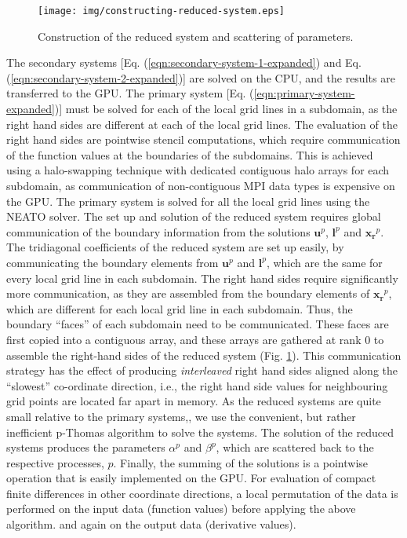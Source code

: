 \begin{figure}
\begin{center}
\texttt{[image: img/constructing-reduced-system.eps]}
\caption{Construction of the reduced system and scattering of parameters.}
\label{fig:constructing-reduced-system}
\end{center}
\end{figure}
%
The secondary systems
[Eq. (\ref{eqn:secondary-system-1-expanded}) and
 Eq. (\ref{eqn:secondary-system-2-expanded})]
are solved on the CPU,
and the results are transferred to the GPU.
%
The primary system [Eq. (\ref{eqn:primary-system-expanded})] must be solved
for each of the local grid lines in a subdomain,
as the right hand sides are different at each of the local grid lines. 
The evaluation of the right hand sides are
pointwise stencil computations,
which require communication of the
function values at the boundaries of the subdomains.
This is achieved using a halo-swapping technique
with dedicated contiguous halo arrays for each subdomain,
as communication of non-contiguous MPI
data types is expensive on the GPU.
The primary system is solved for all the local grid lines
using the NEATO solver.
%
The set up and solution of the reduced system
requires global communication of the boundary information
from the solutions $\bm{u}^p$, $\bm{l}^p$ and $\bm{x_r}^p$.
The tridiagonal coefficients of the reduced system
are set up easily,
by communicating the boundary elements from
$\bm{u}^p$ and $\bm{l}^p$,
which are the same for every local grid line in each subdomain.
The right hand sides require significantly more communication,
as they are assembled from the boundary elements of $\bm{x_r}^p$,
which are different for each local grid line in each subdomain.
Thus, the boundary ``faces'' of each subdomain need to be communicated.
These faces are first copied into a contiguous array,
and these arrays are gathered at rank 0
to assemble the right-hand sides of the reduced system
(Fig. \ref{fig:constructing-reduced-system}).
This communication strategy has the effect of
producing \emph{interleaved} right hand sides
aligned along the ``slowest'' co-ordinate direction, i.e.,
the right hand side values for neighbouring grid points
are located far apart in memory.
As the reduced systems are quite small relative to the primary systems,,
we use the convenient, but rather inefficient
p-Thomas algorithm to solve the systems.
The solution of the reduced systems produces the parameters
$\alpha^p$ and $\beta^p$,
which are scattered back to the respective processes, $p$.
%
Finally, the summing of the solutions
is a pointwise operation that is easily implemented
on the GPU.
For evaluation of compact finite differences in other
coordinate directions,
a local permutation of the data is performed on the input data
(function values)
before applying the above algorithm.
and again on the output data
(derivative values).

